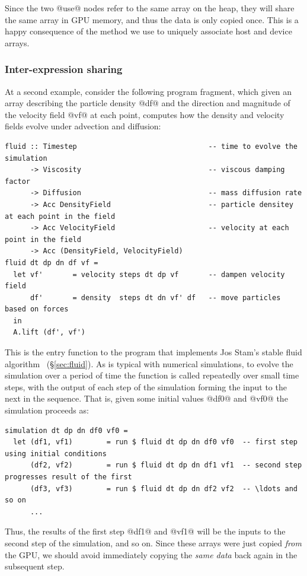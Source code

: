Since the two @use@ nodes refer to the same array on the heap, they will
share the same array in GPU memory, and thus the data is only copied once.
This is a happy consequence of the method we use to uniquely associate host and
device arrays.

\subsubsection{Inter-expression sharing}

At a second example, consider the following program fragment, which given an
array describing the particle density @df@ and the direction and magnitude
of the velocity field @vf@ at each point, computes how the density and
velocity fields evolve under advection and diffusion:
%
\begin{lstlisting}[style=haskell]
fluid :: Timestep                               -- time to evolve the simulation
      -> Viscosity                              -- viscous damping factor
      -> Diffusion                              -- mass diffusion rate
      -> Acc DensityField                       -- particle densitey at each point in the field
      -> Acc VelocityField                      -- velocity at each point in the field
      -> Acc (DensityField, VelocityField)
fluid dt dp dn df vf =
  let vf'       = velocity steps dt dp vf       -- dampen velocity field
      df'       = density  steps dt dn vf' df   -- move particles based on forces
  in
  A.lift (df', vf')
\end{lstlisting}
%
This is the entry function to the program that implements Jos Stam's stable
fluid algorithm~\cite{Stam:1999ey} (\S\ref{sec:fluid}). As is typical with
numerical simulations, to evolve the simulation over a period of time the
function is called repeatedly over small time steps, with the output of each
step of the simulation forming the input to the next in the sequence. That is,
given some initial values @df0@ and @vf0@ the simulation proceeds as:
%
\begin{lstlisting}[style=haskell]
simulation dt dp dn df0 vf0 =
  let (df1, vf1)        = run $ fluid dt dp dn df0 vf0  -- first step using initial conditions
      (df2, vf2)        = run $ fluid dt dp dn df1 vf1  -- second step progresses result of the first
      (df3, vf3)        = run $ fluid dt dp dn df2 vf2  -- \ldots and so on
      ...
\end{lstlisting}
%
Thus, the results of the first step @df1@ and @vf1@ will be the inputs
to the second step of the simulation, and so on. Since these arrays were just
copied \emph{from} the GPU, we should avoid immediately copying the \emph{same
data} back again in the subsequent step.

